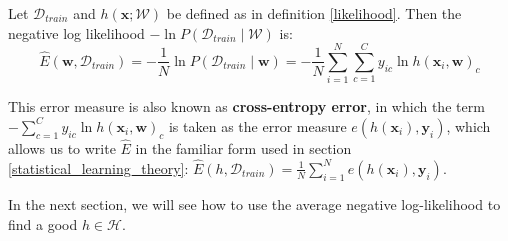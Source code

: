 \begin{definition}
	\label{negative_log-likelihood}
	Let $\mathcal{D}_{train}$ and $h(\mathbf{x}; \mathcal{W})$ be defined as in definition \ref{likelihood}. Then the negative log likelihood $-\ln P(\mathcal{D}_{train} \mid \mathcal{W})$ is:
	$$
	\hat{E}(\mathbf{w}, \mathcal{D}_{train}) = - \frac{1}{N}\ln P(\mathcal{D}_{train} \mid \mathbf{w}) = - \frac{1}{N}\sum\limits_{i=1}^N\sum\limits_{c=1}^C y_{ic} \ln h(\mathbf{x}_i, \mathbf{w})_c
	$$
\end{definition}
This error measure is also known as \textbf{cross-entropy error}, in which the term \\$-\sum_{c=1}^C y_{ic} \ln h(\mathbf{x}_i, \mathbf{w})_c$ is taken as the error measure $e(h(\mathbf{x}_i), \mathbf{y}_i)$, which allows us to write $\hat{E}$ in the familiar form used in section \ref{statistical_learning_theory}: $\hat{E}(h, \mathcal{D}_{train}) = \frac{1}{N}\sum_{i=1}^N e(h(\mathbf{x}_i), \mathbf{y}_i)$.

In the next section, we will see how to use the average negative log-likelihood to find a good $h \in \mathcal{H}$.
